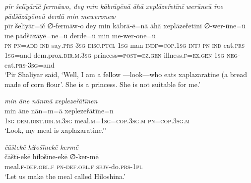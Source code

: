 \ea \label{ŽP.210}
\textit{pīr šelīyārīč fermāwo, dey min kābrāyēnā āhā xeplāzeřetīnī werūneū īne pādšāzāyēneū derdū min meweronew} \\ 
\gll pīr šelīyār=īč ∅-fermāw-o dey min kābrā-ē=nā āhā xeplāzeřetīnī ∅-wer-ūne=ū īne pādšāzāyē=ne=ū derde=ū min me-wer-one=ū \\ 
 \textsc{pn} \textsc{pn}\textsc{=add} \textsc{ind-}say\textsc{.prs}\textsc{-3sg} \textsc{disc.ptcl} \textsc{1sg} man\textsc{-indf}\textsc{=cop}\textsc{.\textsc{1sg}} \textsc{intj} \textsc{pn} \textsc{ind-}eat\textsc{.prs}\textsc{-\textsc{1sg}}=and dem.prox\textsc{.dir}\textsc{.m}\textsc{.3sg} princess\textsc{=\textsc{post}}\textsc{\textsc{=ez.gen}} illness\textsc{.f}\textsc{\textsc{=ez.gen}} \textsc{1sg} \textsc{neg-}eat\textsc{.prs}\textsc{-3sg}=and \\ 
\glt `Pir Shaliyar said, ‘Well, I am a fellow —look—who eats xaplazaratine (a bread made of corn flour’. She is a princess. She is not suitable for me.'
\z 
 
\ea \label{ŽP.214}
\textit{min āne nānmā xeplezeřātīnen} \\ 
\gll min āne nān=m=ā xeplezeřātīne=n \\ 
 \textsc{1sg} \textsc{dem.dist}\textsc{.dir}\textsc{.m}\textsc{.3sg} meal\textsc{.m}\textsc{=\textsc{1sg}}\textsc{=cop}\textsc{.3sg}\textsc{.m} \textsc{pn}\textsc{=cop}\textsc{.3sg}\textsc{.m} \\ 
\glt `Look, my meal is xaplazaratine.’'
\z 
 
\ea \label{ŽP.241}
\textit{čāštekē hiɫošīnekē kermē} \\ 
\gll čāštī-ekē hiɫošīne-ekē ∅-ker-mē \\ 
 meal\textsc{.f}\textsc{-def}\textsc{.obl}\textsc{.f} \textsc{pn}\textsc{-def}\textsc{.obl}\textsc{.f} \textsc{sbjv-}do\textsc{.prs}\textsc{-1pl} \\ 
\glt `Let us make the meal called Hiloshina.'
\z 
 
